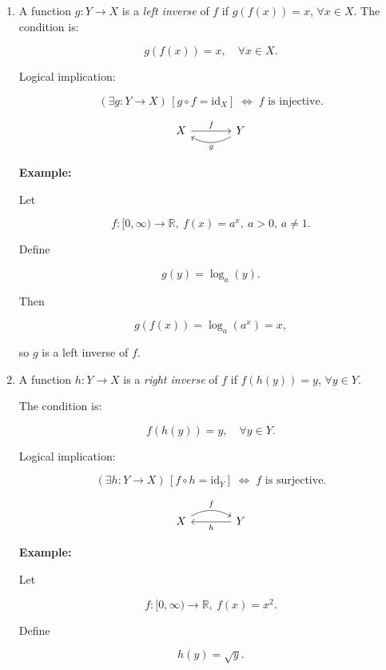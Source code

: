 \documentclass[12pt,a4paper,openany]{article}
\begin{document}
\begin{enumerate}
\item A function $g : Y \to X$ is a \textit{left inverse} of $f$ if $g(f(x)) = x$,  $\forall x \in X$.
    The condition is:

    \[
    g(f(x)) = x, \quad \forall x \in X.
    \]

    Logical implication:

    \[
    (\exists g : Y \to X)\,[g \circ f = \mathrm{id}_X]
    \;\Longleftrightarrow\;
    f \text{ is injective}.
    \]

    \[
    \begin{tikzcd}[row sep=large, column sep=large]
    X \arrow[r, "f"]
    & Y \arrow[l, bend left=30, "g"]
    \end{tikzcd}
    \]

    \textbf{Example:}

    Let

    \[
    f: [0, \infty) \to \mathbb{R}, \
    f(x) = a^x, \ a > 0,\, a \ne 1.
    \]

    Define 

    \[
    g(y) = \log_a(y).
    \]

    Then

    \[
    g(f(x)) = \log_a(a^x) = x,
    \]

    so $g$ is a left inverse of $f$.

\item A function $h : Y \to X$ is a \textit{right inverse} of $f$ if $f(h(y)) = y$,  $\forall y \in Y$.

    The condition is:

    \[
    f(h(y)) = y, \quad \forall y \in Y.
    \]

    Logical implication:

    \[
    (\exists h : Y \to X)\,[f \circ h = \mathrm{id}_Y]
    \;\Longleftrightarrow\;
    f \text{ is surjective}.
    \]

    \[
    \begin{tikzcd}[row sep=large, column sep=large]
    X \arrow[r, bend left=30, "f"]
    & Y \arrow[l, "h"]
    \end{tikzcd}
    \]

    \textbf{Example:}

    Let

    \[
    f: [0, \infty) \to \mathbb{R}, \
    f(x) = x^2.
    \]

    Define

    \[
    h(y) = \sqrt{y}.
    \]


\end{enumerate}
\end{document}
